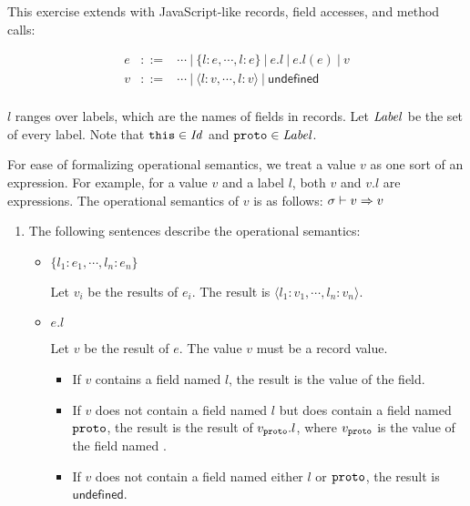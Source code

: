 \begin{exercise}

This exercise extends \Lang with JavaScript-like records, field accesses,
  and method calls:

\[
\begin{array}{rcl}
  e & ::= & \cdots\ |\ \{l:e,\cdots,l:e\}\ |\ e.l\ |\ e.l(e)\ |\ v \\
  v & ::= & \cdots\ |\ \langle l:v,\cdots,l:v\rangle \ |\ \textsf{undefined} \\
\end{array}
\]

$l$ ranges over labels, which are the names of fields in records.
Let $\mbox{\emph{Label}}$ be the set of every label.
Note that $\texttt{this}\in\mbox{\emph{Id}}$ and $\texttt{proto}\in\mbox{\emph{Label}}$.

For ease of formalizing operational semantics, we treat a value $v$ as one sort
of an expression. For example, for a value $v$ and a label $l$, both $v$ and
$v.l$ are expressions.
The operational semantics of $v$ is as follows: $\sigma\vdash v\Rightarrow v$

\begin{enumerate}
  \item
    The following sentences describe the operational semantics:
    \begin{itemize}
      \item $\{l_1:e_1,\cdots,l_n:e_n\}$

        Let $v_i$ be the results of $e_i$.
        The result is $\langle l_1:v_1,\cdots,l_n:v_n\rangle$.

      \item $e.l$

        Let $v$ be the result of $e$. The value $v$ must be a record value.
        \begin{itemize}
          \item If $v$ contains a field named $l$, the result is the value of the
            field.
          \item If $v$ does not contain a field named $l$ but does contain a field
            named $\texttt{proto}$,
            the result is the result of $v_{\texttt{proto}}.l$, where
            $v_{\texttt{proto}}$ is the value of the field named .
          \item
            If $v$ does not contain a field named either $l$ or $\texttt{proto}$,
            the result is $\textsf{undefined}$.
        \end{itemize}


\end{itemize}
\end{enumerate}
\end{exercise}
